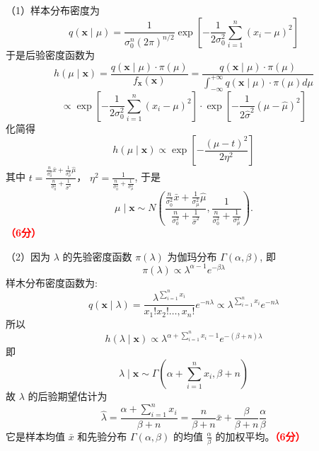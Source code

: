 \documentclass[12pt,a4paper,openany,twoside]{ctexbook}
\begin{document}
\begin{Solution}
	（1）样本分布密度为
	$$
	q(\mathbf{x} \mid \mu)=\frac{1}{\sigma_0^{n}(2 \pi)^{n / 2}} \exp \left[-\frac{1}{2 \sigma_0^{2}} \sum_{i=1}^{n}\left(x_{i}-\mu\right)^{2}\right]
	$$
	于是后验密度函数为
	$$
	h(\mu \mid \mathbf{x})=\frac{q(\mathbf{x} \mid \mu) \cdot \pi(\mu)}{f_{\mathbf{x}}(\mathbf{x})}=\frac{q(\mathbf{x} \mid \mu) \cdot \pi(\mu)}{\int_{-\infty}^{+\infty} q(\mathbf{x} \mid \mu) \cdot \pi(\mu) d \mu}
	$$
	$$
	\propto \exp \left[-\frac{1}{2 \sigma_0^{2}} \sum_{i=1}^{n}\left(x_{i}-\mu\right)^{2}\right] \cdot \exp \left[-\frac{1}{2 \hat{\sigma}^{2}}\left(\mu-\hat{\mu}\right)^{2}\right]
	$$
	化简得
	$$
	h(\mu \mid \mathbf{x}) \propto \exp \left[-\frac{(\mu-t)^{2}}{2 \eta^{2}}\right]
	$$
	其中 $t=\frac{\frac{n}{\sigma_0^{2}} \bar{x}+\frac{1}{\sigma_{\mu}^{2}} \hat{\mu}}{\frac{n}{\sigma_0^{2}}+\frac{1}{\hat{\sigma}^{2}}}$，
	$\eta^{2}=\frac{1}{\frac{n}{\sigma_0^{2}}+\frac{1}{\sigma_{\mu}^{2}}}$, 于是
	$$
	\mu \mid \mathbf{x} \sim N\left(\frac{\frac{n}{\sigma_0^{2}} \bar{x}+\frac{1}{\sigma_{\mu}^{2}} \hat{\mu}}{\frac{n}{\sigma_0^{2}}+\frac{1}{\hat{\sigma}^{2}}}, \frac{1}{\frac{n}{\sigma_0^{2}}+\frac{1}{\sigma_{\mu}^{2}}}\right) .
	$$\hfill \textcolor{red}{\textbf{（6分）}}
	
	（2）因为 $\lambda$ 的先验密度函数 $\pi(\lambda)$ 为伽玛分布 $\Gamma(\alpha, \beta)$, 即
	$$
	\pi(\lambda) \propto \lambda^{\alpha-1} e^{-\beta \lambda}
	$$
	样木分布密度函数为:
	$$
	q(\mathbf{x} \mid \lambda)=\frac{\lambda^{\sum_{i=1}^{n} x_{i}}}{x_{1} ! x_{2} ! \ldots, x_{n} !} e^{-n \lambda} \propto \lambda^{\sum_{i=1}^{n} x_{i}} e^{-n \lambda}
	$$
	所以
	$$
	h(\lambda \mid \mathbf{x}) \propto \lambda^{\alpha+\sum_{i=1}^{n} x_{i}-1} e^{-(\beta+n) \lambda}
	$$
	即
	$$
	\lambda \mid \mathbf{x} \sim \Gamma\left(\alpha+\sum_{i=1}^{n} x_{i}, \beta+n\right)
	$$
	故 $\lambda$ 的后验期望估计为
	$$
	\hat{\lambda}=\frac{\alpha+\sum_{i=1}^{n} x_{i}}{\beta+n}=\frac{n}{\beta+n} \bar{x}+\frac{\beta}{\beta+n} \frac{\alpha}{\beta}
	$$
	它是样本均值 $\bar{x}$ 和先验分布 $\Gamma(\alpha, \beta)$ 的均值 $\frac{\alpha}{\beta}$ 的加权平均。\hfill \textcolor{red}{\textbf{（6分）}}
\end{Solution}
\end{document}
